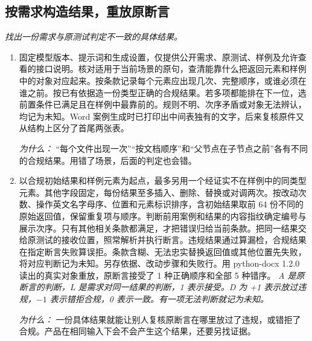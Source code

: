 \documentclass[10pt,a4paper]{article}
\begin{document}
\subsection*{按需求构造结果，重放原断言}
\emph{找出一份需求与原测试判定不一致的具体结果。}
\begin{enumerate}[leftmargin=*,start=2]
  \item 固定模型版本、提示词和生成设置，仅提供公开需求、原测试、样例及允许查看的接口说明。核对适用于当前场景的原句，查清能靠什么把返回元素和样例中的对象对应起来。按条款记录每个元素应出现几次、完整顺序，或谁必须在谁之前。按已有依据造一份类型正确的合规结果。若多项都能排在下一位，选前置条件已满足且在样例中最靠前的。规则不明、次序矛盾或对象无法辨认，均记为未知。Word 案例生成时已打印出中间表独有的文字，后来复核原件又从结构上区分了首尾两张表。
\par\emph{为什么：} “每个文件出现一次”“按文档顺序”和“父节点在子节点之前”各有不同的合规结果。用错了场景，后面的判定也会错。
  \item 以合规初始结果和样例元素为起点，最多另用一个经证实不在样例中的同类型元素。其他字段固定，每份结果至多插入、删除、替换或对调两次。按改动次数、操作英文名字母序、位置和元素标识排序，含初始结果取前 64 份不同的原始返回值，保留重复项与顺序。判断前用案例和结果的内容指纹确定编号与展示次序。只有其他相关条款都满足，才把错误归给当前条款。把同一结果交给原测试的接收位置，照常解析并执行断言。违规结果通过算漏检，合规结果在指定断言失败算误拒。条款含糊、无法忠实替换返回值或其他位置先失败，将对应判断记为未知。另存依据、改动步骤和失败行。用 python-docx 1.2.0 读出的真实对象重放，原断言接受了 1 种正确顺序和全部 5 种错序。
\noindent\emph{A 是原断言的判断，L 是需求对同一结果的判断，1 表示接受。D 为 +1 表示放过违规，\(- 1\) 表示错拒合规，0 表示一致。有一项无法判断就记为未知。}
\par{}
\par\emph{为什么：} 一份具体结果就能让别人复核原断言在哪里放过了违规，或错拒了合规。产品在相同输入下会不会产生这个结果，还要另找证据。
\end{enumerate}
\end{document}
